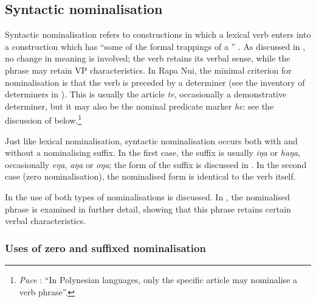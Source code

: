 \subsection{Syntactic nominalisation}\label{sec:3.2.3}
Syntactic nominalisation refers to constructions in which a lexical verb enters into a construction which has “some of the formal trappings of a ” \citep[65]{Clark1981}. As discussed in , no change in meaning is involved; the verb retains its verbal sense, while the phrase may retain VP characteristics. In Rapa Nui, the minimal criterion for nominalisation is that the verb is preceded by a determiner (see the inventory of determiners in ). This is usually the article \textit{te}, occasionally a demonstrative determiner, but it may also be the nominal predicate marker \textit{he}: see the discussion of  below.\footnote{\label{fn:104}\textit{Pace} \citet[136]{Moyse-Faurie2011}: “In Polynesian languages, only the specific article may nominalise a verb phrase”.}

Just like lexical nominalisation, syntactic nominalisation occurs both with and without a nominalising suffix. In the first case, the suffix is usually \textit{iŋa} or \textit{haŋa}, occasionally \textit{eŋa}, \textit{aŋa} or \textit{oŋa}; the form of the suffix is discussed in . In the second case (zero nominalisation), the nominalised form is identical to the verb itself.

In  the use of both types of nominalisations is discussed. In , the nominalised phrase is examined in further detail, showing that this phrase retains certain verbal characteristics.

\subsubsection[Uses of zero and suffixed nominalisation]{Uses of zero and suffixed nominalisation}\label{sec:3.2.3.1}

